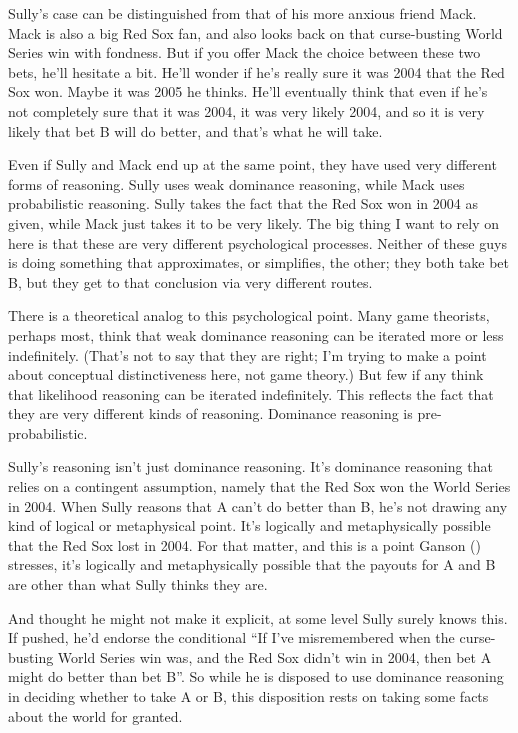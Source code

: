 \documentclass[
  12pt,
  letterpaper,
]{scrbook}
\begin{document}
Sully's case can be distinguished from that of his more anxious friend
Mack. Mack is also a big Red Sox fan, and also looks back on that
curse-busting World Series win with fondness. But if you offer Mack the
choice between these two bets, he'll hesitate a bit. He'll wonder if
he's really sure it was 2004 that the Red Sox won. Maybe it was 2005 he
thinks. He'll eventually think that even if he's not completely sure
that it was 2004, it was very likely 2004, and so it is very likely that
bet B will do better, and that's what he will take.

Even if Sully and Mack end up at the same point, they have used very
different forms of reasoning. Sully uses weak dominance reasoning, while
Mack uses probabilistic reasoning. Sully takes the fact that the Red Sox
won in 2004 as given, while Mack just takes it to be very likely. The
big thing I want to rely on here is that these are very different
psychological processes. Neither of these guys is doing something that
approximates, or simplifies, the other; they both take bet B, but they
get to that conclusion via very different routes.

There is a theoretical analog to this psychological point. Many game
theorists, perhaps most, think that weak dominance reasoning can be
iterated more or less indefinitely. (That's not to say that they are
right; I'm trying to make a point about conceptual distinctiveness here,
not game theory.) But few if any think that likelihood reasoning can be
iterated indefinitely. This reflects the fact that they are very
different kinds of reasoning. Dominance reasoning is pre-probabilistic.

Sully's reasoning isn't just dominance reasoning. It's dominance
reasoning that relies on a contingent assumption, namely that the Red
Sox won the World Series in 2004. When Sully reasons that A can't do
better than B, he's not drawing any kind of logical or metaphysical
point. It's logically and metaphysically possible that the Red Sox lost
in 2004. For that matter, and this is a point Ganson
() stresses, it's logically and
metaphysically possible that the payouts for A and B are other than what
Sully thinks they are.

And thought he might not make it explicit, at some level Sully surely
knows this. If pushed, he'd endorse the conditional ``If I've
misremembered when the curse-busting World Series win was, and the Red
Sox didn't win in 2004, then bet A might do better than bet B''. So
while he is disposed to use dominance reasoning in deciding whether to
take A or B, this disposition rests on taking some facts about the world
for granted.
\end{document}
